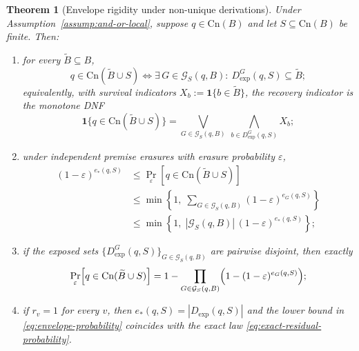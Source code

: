 \documentclass[journal]{IEEEtran}
\newcommand{\Cn}{\text{Cn}}
\newtheorem{theorem}{Theorem}[section]
\numberwithin{equation}{section}
\begin{document}
\begin{theorem}[Envelope rigidity under non-unique derivations]
\label{thm:envelope-rigidity}
Under Assumption~\ref{assump:and-or-local}, suppose \(q\in\Cn(B)\) and let
\(S\subseteq\Cn(B)\) be finite.  Then:
\begin{enumerate}[label=\textup{(\alph*)}]
\item for every \(\widetilde B\subseteq B\),
\begin{equation}
  q\in\Cn(\widetilde B\cup S)
  \Longleftrightarrow
  \exists\,G\in\mathcal G_S(q,B):
  \ D_{\mathrm{exp}}^{G}(q,S)\subseteq\widetilde B;
\label{eq:envelope-event}
\end{equation}
equivalently, with survival indicators
\(X_b:=\mathbf 1\{b\in\widetilde B\}\), the recovery indicator is the
monotone DNF
\begin{equation}
  \mathbf 1\{q\in\Cn(\widetilde B\cup S)\}
  =
  \bigvee_{G\in\mathcal G_S(q,B)}
  \ \bigwedge_{b\in D_{\mathrm{exp}}^{G}(q,S)} X_b;
\label{eq:envelope-dnf}
\end{equation}
\item under independent premise erasures with erasure probability
\(\varepsilon\),
\begin{align}
  (1-\varepsilon)^{e_*(q,S)}
  &\le
  \Pr_{\varepsilon}\!\left[q\in\Cn(\widetilde B\cup S)\right]
  \nonumber\\
  &\le
  \min\!\left\{
    1,\;
    \sum_{G\in\mathcal G_S(q,B)}(1-\varepsilon)^{e_G(q,S)}
  \right\}
  \nonumber\\
  &\le
  \min\!\left\{
    1,\;
    |\mathcal G_S(q,B)|\,(1-\varepsilon)^{e_*(q,S)}
  \right\};
\label{eq:envelope-probability}
\end{align}
\item if the exposed sets
\(\{D_{\mathrm{exp}}^{G}(q,S)\}_{G\in\mathcal G_S(q,B)}\) are pairwise
disjoint, then exactly
\begin{equation}
  \Pr_{\varepsilon}\!\left[q\in\Cn(\widetilde B\cup S)\right]
  =
  1-\prod_{G\in\mathcal G_S(q,B)}
  \Bigl(1-(1-\varepsilon)^{e_G(q,S)}\Bigr);
\label{eq:envelope-independent}
\end{equation}
\item if \(r_v=1\) for every \(v\), then \(e_*(q,S)=|D_{\mathrm{exp}}(q,S)|\)
and the lower bound in \eqref{eq:envelope-probability} coincides with the
exact law \eqref{eq:exact-residual-probability}.
\end{enumerate}
\end{theorem}
\end{document}
